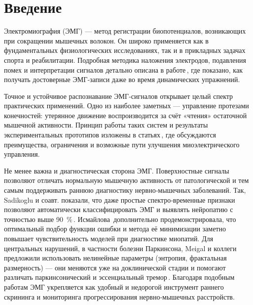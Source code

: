 \documentclass[a4paper,12pt]{article}
\begin{document}

\newpage

\renewcommand{\contentsname}{Содержание}
\tableofcontents

\newpage

\section*{Введение}

Электромиография (ЭМГ) — метод регистрации биопотенциалов, возникающих при сокращении мышечных волокон. Он широко применяется как в фундаментальных физиологических исследованиях, так и в прикладных задачах спорта и реабилитации. Подробная методика наложения электродов, подавления помех и интерпретации сигналов детально описана в работе\,\cite{kostyuchenko2007}, где показано, как получать достоверные ЭМГ‑записи даже во время динамических упражнений.

Точное и устойчивое распознавание ЭМГ‑сигналов открывает целый спектр практических применений. Одно из наиболее заметных — управление протезами конечностей: утерянное движение воспроизводится за счёт «чтения» остаточной мышечной активности. Принцип работы таких систем и результаты экспериментальных прототипов изложены в статьях\,\cite{sudarsan2012,parajuli2019}, где обсуждаются преимущества, ограничения и возможные пути улучшения миоэлектрического управления.

Не менее важна и диагностическая сторона ЭМГ. Поверхностные сигналы позволяют отличать нормальную мышечную активность от патологической и тем самым поддерживать раннюю диагностику нервно‑мышечных заболеваний. Так, Sadikoglu и соавт. показали, что даже простые спектро‑временные признаки позволяют автоматически классифицировать ЭМГ и выявлять нейропатию с точностью выше 90~\%\,\cite{sadikoglu2017}. Исмайлова\,\cite{ismailova2019} дополнительно продемонстрировала, что оптимальный подбор функции ошибки и метода её минимизации заметно повышает чувствительность моделей при диагностике миопатий. Для центральных нарушений, в частности болезни Паркинсона, Meigal и коллеги предложили использовать нелинейные параметры (энтропия, фрактальная размерность) — они меняются уже на доклинической стадии и помогают различать паркинсонический и эссенциальный тремор\,\cite{meigal2013}. Благодаря подобным работам ЭМГ укрепляется как удобный и недорогой инструмент раннего скрининга и мониторинга прогрессирования нервно‑мышечных расстройств.
\end{document}
